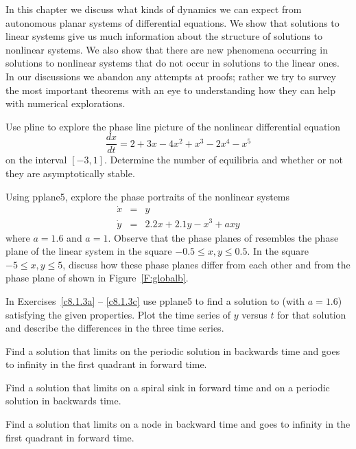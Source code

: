 \documentclass{ximera}
\begin{document}
In this chapter we discuss what kinds of dynamics we can expect
from autonomous planar systems of differential equations.  We 
show that solutions to linear systems give us much 
information about the structure of solutions to nonlinear 
systems.  We also show that there are new phenomena 
occurring in solutions to nonlinear systems that do not occur 
in solutions to the linear ones.  In our discussions we abandon 
any attempts at proofs; rather we try to survey the most 
important theorems with an eye to understanding how they can 
help with numerical explorations.

\EXER

\CEXER

\begin{exercise} \label{c8.1.1}
Use {\sf pline} to explore the phase line 
picture of the nonlinear differential equation
\[
\frac{dx}{dt} = 2 + 3x - 4x^2 + x^3 - 2x^4 -x^5
\]
on the interval $[-3,1]$.  Determine the number of equilibria
and whether or not they are asymptotically stable.
\end{exercise}


\begin{exercise} \label{c8.1.2}
Using {\sf pplane5}, explore the phase portraits of the nonlinear 
systems
\begin{equation*}  \label{e:global2exam}
\begin{array}{rcl}
\dot{x} & = & y \\
\dot{y} & = & 2.2x + 2.1y - x^3 + axy 
\end{array}
\end{equation*} 
where $a=1.6$ and $a=1$.  Observe that the phase planes of 
 resembles the phase plane of the linear system 
 in the square $-0.5\leq x,y \leq 0.5$.  In the 
square $-5\leq x,y\leq 5$, discuss how these phase planes differ 
from each other and from the phase plane of  
shown in Figure~\ref{F:globalb}.
\end{exercise}

\noindent In Exercises~\ref{c8.1.3a} -- \ref{c8.1.3c} use {\sf pplane5}
to find a solution to  (with $a=1.6$) satisfying the 
given properties. Plot the time series of $y$ versus $t$ for that solution 
and describe the differences in the three time series.
\begin{exercise} \label{c8.1.3a}
Find a solution that limits on the periodic solution in backwards time and 
goes to infinity in the first quadrant in forward time.
\end{exercise}
\begin{exercise} \label{c8.1.3b}
Find a solution that limits on a spiral sink in forward time and on a periodic 
solution in backwards time.
\end{exercise}
\begin{exercise} \label{c8.1.3c}
Find a solution that limits on a node in backward time and goes to infinity 
in the first quadrant in forward time.
\end{exercise}
\end{document}
